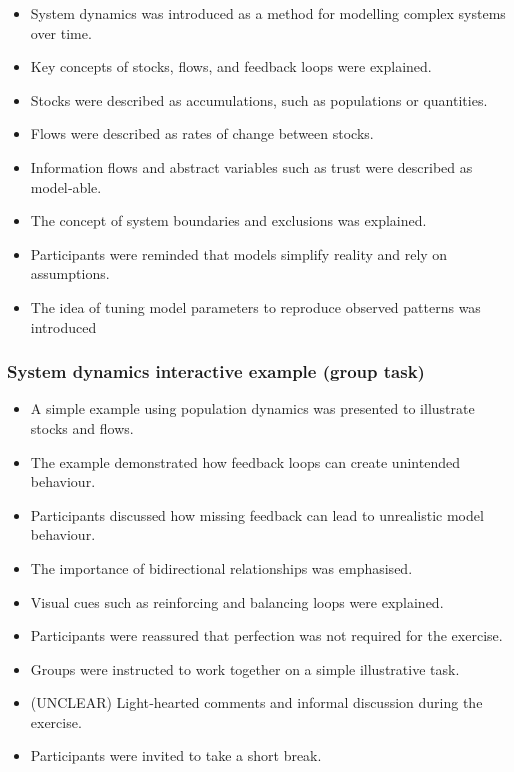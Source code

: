 \documentclass{article}
\begin{document}
\begin{itemize}
    \item System dynamics was introduced as a method for modelling complex systems over time.
    \item Key concepts of stocks, flows, and feedback loops were explained.
    \item Stocks were described as accumulations, such as populations or quantities.
    \item Flows were described as rates of change between stocks.
    \item Information flows and abstract variables such as trust were described as model‑able.
    \item The concept of system boundaries and exclusions was explained.
    \item Participants were reminded that models simplify reality and rely on assumptions.
    \item The idea of tuning model parameters to reproduce observed patterns was introduced
\end{itemize}

\subsubsection{System dynamics interactive example (group task)}

\begin{itemize}
    \item A simple example using population dynamics was presented to illustrate stocks and flows.
    \item The example demonstrated how feedback loops can create unintended behaviour.
    \item Participants discussed how missing feedback can lead to unrealistic model behaviour.
    \item The importance of bidirectional relationships was emphasised.
    \item Visual cues such as reinforcing and balancing loops were explained.
    \item Participants were reassured that perfection was not required for the exercise.
    \item Groups were instructed to work together on a simple illustrative task.
    \item (UNCLEAR) Light‑hearted comments and informal discussion during the exercise.
    \item Participants were invited to take a short break.
\end{itemize}
\end{document}

